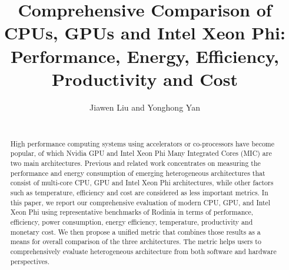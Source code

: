 \documentclass[10pt]{sig-alternate-05-2015}
\begin{document}
\title{Comprehensive Comparison of CPUs, GPUs and Intel Xeon Phi: Performance, Energy, Efficiency, Productivity and Cost}




\author{
%
%
\alignauthor Jiawen Liu and Yonghong Yan\\
    \\
%
%
%
}

\maketitle
\begin{abstract}
High performance computing systems using accelerators or co-processors have become popular, of which Nvidia GPU and 
Intel Xeon Phi Many Integrated Cores (MIC) are two main architectures.  
Previous and related work concentrates on measuring the performance and energy consumption of emerging 
heterogeneous architectures that consist of multi-core CPU, GPU and Intel Xeon Phi architectures,
while other factors such as temperature, efficiency and cost are considered as less important metrics.  
In this paper, we report our comprehensive evaluation of modern CPU, GPU, and Intel Xeon Phi using representative benchmarks of Rodinia
in terms of performance, efficiency, power consumption, energy efficiency, temperature, productivity and monetary cost. 
We then propose a unified metric that combines those results as a means for overall comparison of the three architectures. 
The metric helps users to comprehensively evaluate heterogeneous architecture from both software and hardware perspectives.
\end{abstract}
\end{document}
